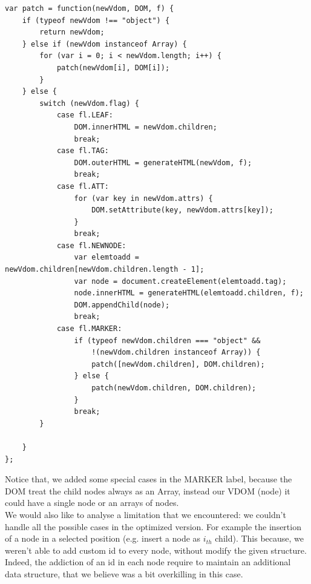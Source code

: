 \documentclass[10pt]{article}
\begin{document}
\begin{lstlisting}[caption=\textit{patch} function]
var patch = function(newVdom, DOM, f) {
    if (typeof newVdom !== "object") {
        return newVdom;
    } else if (newVdom instanceof Array) {
        for (var i = 0; i < newVdom.length; i++) {
            patch(newVdom[i], DOM[i]);
        }
    } else {
        switch (newVdom.flag) {
            case fl.LEAF:
                DOM.innerHTML = newVdom.children;
                break;
            case fl.TAG:
                DOM.outerHTML = generateHTML(newVdom, f);
                break;
            case fl.ATT:
                for (var key in newVdom.attrs) {
                    DOM.setAttribute(key, newVdom.attrs[key]);
                }
                break;
            case fl.NEWNODE:
                var elemtoadd = newVdom.children[newVdom.children.length - 1];
                var node = document.createElement(elemtoadd.tag);
                node.innerHTML = generateHTML(elemtoadd.children, f);
                DOM.appendChild(node);
                break;
            case fl.MARKER:
                if (typeof newVdom.children === "object" &&
                    !(newVdom.children instanceof Array)) {
                    patch([newVdom.children], DOM.children);
                } else {
                    patch(newVdom.children, DOM.children);
                }
                break;
        }

    }
};
\end{lstlisting} 
Notice that, we added some special cases in the MARKER label, because the DOM treat the child nodes always as an Array, instead our VDOM (node) it could have a single node or an arrays of nodes.\\ We would also like to analyse a limitation that we encountered: we couldn't handle all the possible cases in the optimized version. For example the insertion of a node in a selected position (e.g. insert a node as $i_{th}$ child). This because, we weren't able to add custom id to every node, without modify the given structure. Indeed, the addiction of an id in each node require to maintain an additional data structure, that we believe was a bit overkilling in this case. 
\end{document}
